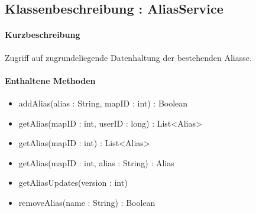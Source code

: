 \subsection{Klassenbeschreibung : AliasService}%
\paragraph*{Kurzbeschreibung}
Zugriff auf zugrundeliegende Datenhaltung der bestehenden Aliasse.
\paragraph*{Enthaltene Methoden}
\begin{itemize}
    \item addAlias(alias : String, mapID : int) : Boolean
    \item getAlias(mapID : int, userID : long) : List<Alias>
    \item getAlias(mapID : int) : List<Alias>
    \item getAlias(mapID : int, alias : String) : Alias
    \item getAliasUpdates(version : int)
    \item removeAlias(name : String) : Boolean
\end{itemize}
